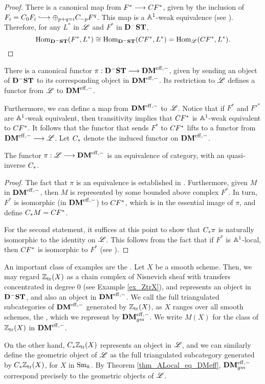 \begin{proof}
There is a canonical map from $F^* \to \suslC[] F^*$,
given by the inclusion of $F_i = \suslC[0] F_i \into \oplus_{p + 
q = i} \suslC[-p] F^q$. This map is a $\A^1$-weak equivalence
(see \cite[14.4]{MVW}). Therefore, for any $L^*$ in $\ALocal$
and $F^*$ in $\DShCor$,
\[
\hom_{\DShCor}(F^*, L^*) \cong \hom_{\DShCor}(\suslC[] F^*, L^*)
   = \hom_{\ALocal}(\suslC[] F^*, L^*).
\qedhere
\]
\end{proof}

There is a canonical functor $\pi: \DShCor \to \DMeff$, given
by sending an object of $\DShCor$ to its corresponding object in
$\DMeff$. Its restriction to $\ALocal$ defines a functor from
$\ALocal$ to $\DMeff$.

Furthermore, we can define a map from $\DMeff$ to $\ALocal$. 
Notice that if $F^*$ and ${F'}^*$ are $\A^1$-weak equivalent, then
transitivity implies that $\suslC[] F^*$ is $\A^1$-weak equivalent 
to $\suslC[] F^*$. It follows that the functor that sends $F^*$
to $\suslC[] F^*$ lifts to a functor from $\DMeff \to \ALocal$.
Let $\suslC$ denote the induced functor on $\DMeff$.

\begin{thm}\label{thm_ALocal_eq_DMeff}
The functor $\pi: \ALocal \to \DMeff$ is an equivalence of 
category, with an quasi-inverse $\suslC$.
\end{thm}

\begin{proof}
The fact that $\pi$ is an equivalence is established in
\cite[14.11]{MVW}. Furthermore, given $M$ in
$\DMeff$, then $M$ is represented by some bounded above complex 
$F^*$. In turn, $F^*$ is isomorphic (in $\DMeff$) to $\suslC[] 
F^*$, which is in the essential image of $\pi$, and define
$\suslC M = \suslC[] F^*$. 

For the second statement, it suffices at this point to show that 
$\suslC \pi$ is naturally isomorphic to the identity on $\ALocal$. 
This follows from the fact that if $F^*$ is $\A^1$-local, then 
$\suslC[] F^*$ is isomorphic to $F^*$ (see \cite[14.9]{MVW}).
\end{proof}

\begin{ex}\label{ex_geo_obj}
An important class of examples are the . 
Let $X$ be a smooth scheme. Then, we may regard $\Ztr(X)$ as a
chain complex of Nisnevich sheaf with transfers concentrated
in degree 0 (see Example \ref{ex_ZtrX}), and represents an object in
$\DShCor$, and also an object in $\DMeff$. We call the full
triangulated subcategories of $\DMeff$ generated by $\Ztr(X)$, as 
$X$ ranges over all smooth schemes, the , which we represent by $\DMeffgm$. We write $M(X)$ for 
the class of $\Ztr(X)$ in $\DMeff$.

On the other hand, $\suslC \Ztr(X)$ represents an object in 
$\ALocal$, and we can similarly define the geometric object of 
$\ALocal$ as the full triangulated subcategory generated by
$\suslC \Ztr(X)$, for $X$ in $\Sm$. By Theorem 
\ref{thm_ALocal_eq_DMeff}, $\DMeffgm$ correspond precisely to
the geometric objects of $\ALocal$.
\end{ex}

